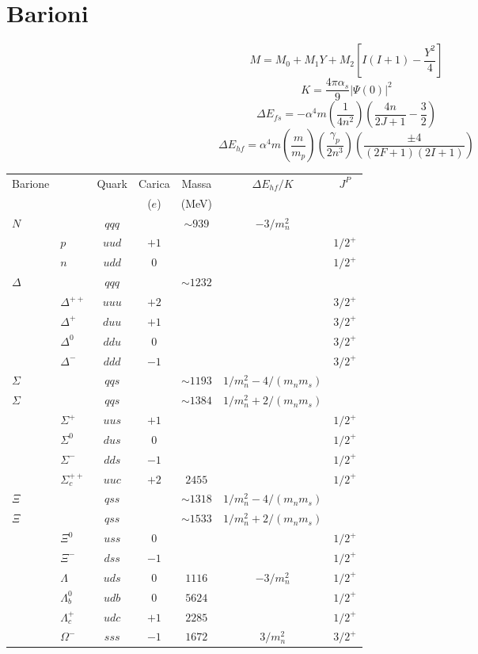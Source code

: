 \documentclass[10pt, onecolumn, a4paper]{article}
\def\({\left(}
\def\){\right)}
\def\[{\left[}
\def\]{\right]}
\begin{document}
\section{Barioni} %
$$M=M_0+M_1Y+M_2\[I\(I+1\)-\frac{Y^2}{4}\]$$
$$K=\frac{4\pi\alpha_s}{9}\left|\Psi\(0\)\right|^2$$
$$\Delta E_{fs}=-\alpha^4m\(\frac{1}{4n^2}\)\(\frac{4n}{2J+1}-\frac{3}{2}\)$$
$$\Delta E_{hf}=\alpha^4m\(\frac{m}{m_p}\)\(\frac{\gamma_p}{2n^3}\)\(\frac{\pm 4}{\(2F+1\)\(2I+1\)}\)$$
\begin{center}\begin{tabularx}{\textwidth}{X l | c c c | c c}
\toprule
\multirow{2}{*}{Barione} 	& 	& \multirow{2}{*}{Quark} 	& Carica 	& Massa 		& \multirow{2}{*}{$\Delta E_{hf}/K$} 	& \multirow{2}{*}{$J^{P}$} 	\\
					&	&					& ($e$) 	& (\si{MeV}) 	&							&					\\
\midrule
 $N$ & & $qqq$ &  & $\sim939$ & $-3/m^2_n$ \\
 & $p$ & $uud$ & $+1$ & & & $1/2^+$ \\
 & $n$ & $udd$ & $0$ & & & $1/2^+$ \\
\midrule
$\Delta$ &  & $qqq$ &  & $\sim1232$ &  \\
 & $\Delta^{++}$ & $uuu$ & $+2$ &  & & $3/2^+$ \\
 & $\Delta^+$ & $duu$ & $+1$ &  & & $3/2^+$ \\
 & $\Delta^0$ & $ddu$ & $0$ &  & & $3/2^+$ \\
 & $\Delta^-$ & $ddd$ & $-1$ &  & & $3/2^+$ \\
\midrule
 $\Sigma$ & & $qqs$ &  & $\sim1193$ & $1/m^2_n-4/\left(m_nm_s\right)$ &  \\
 $\Sigma$ & & $qqs$ &  & $\sim1384$ & $1/m^2_n+2/\left(m_nm_s\right)$ &  \\
 & $\Sigma^+$ & $uus$ & $+1$ &  & & $1/2^+$ \\
 & $\Sigma^0$ & $dus$ & $0$ &  & & $1/2^+$ \\
 & $\Sigma^-$ & $dds$ & $-1$ &  & & $1/2^+$ \\
 & $\Sigma^{++}_c$ & $uuc$ & $+2$ & $2455$ & & $1/2^+$\\
\midrule
 $\Xi$ & & $qss$ &  & $\sim1318$ & $1/m^2_n-4/\left(m_nm_s\right)$ & \\
 $\Xi$ & & $qss$ &  & $\sim1533$ & $1/m^2_n+2/\left(m_nm_s\right)$ & \\
 & $\Xi^0$ & $uss$ & $0$ &  & & $1/2^+$ \\
 & $\Xi^-$ & $dss$ & $-1$ &  & & $1/2^+$ \\
\midrule
 & $\Lambda$ & $uds$ & $0$ & $1116$ & $-3/m^2_n$ & $1/2^+$ \\
 & $\Lambda^0_b$ & $udb$ & $0$ & $5624$ & & $1/2^+$ \\
 & $\Lambda^+_c$ & $udc$ & $+1$ & $2285$ & & $1/2^+$  \\
 \midrule
 & $\Omega^-$ & $sss$ & $-1$ & $1672$ & $3/m^2_n$ & $3/2^+$ \\
\bottomrule
\end{tabularx}\end{center}
\end{document}
